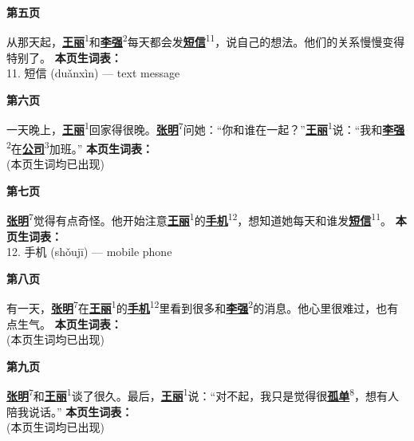 \documentclass[20pt]{extarticle}
\newcommand{\glossedword}[2]{\uline{\textbf{#1}}\textsuperscript{#2}}
\begin{document}
\begin{center}
    {\fontsize{36}{44}\selectfont \textbf{第五页}}
\end{center}
\vspace{2em}
{\fontsize{22}{30}\selectfont
\noindent
从那天起，\glossedword{王丽}{1}和\glossedword{李强}{2}每天都会发\glossedword{短信}{11}，说自己的想法。他们的关系慢慢变得特别了。
}
\vfill
{\fontsize{18}{26}\selectfont
\noindent
\textbf{本页生词表：}\\[0.5em]
11. 短信 (duǎnxìn) — text message
}
\newpage

\begin{center}
    {\fontsize{36}{44}\selectfont \textbf{第六页}}
\end{center}
\vspace{2em}
{\fontsize{22}{30}\selectfont
\noindent
一天晚上，\glossedword{王丽}{1}回家得很晚。\glossedword{张明}{7}问她：“你和谁在一起？”\glossedword{王丽}{1}说：“我和\glossedword{李强}{2}在\glossedword{公司}{3}加班。”
}
\vfill
{\fontsize{18}{26}\selectfont
\noindent
\textbf{本页生词表：}\\[0.5em]
(本页生词均已出现)
}
\newpage

\begin{center}
    {\fontsize{36}{44}\selectfont \textbf{第七页}}
\end{center}
\vspace{2em}
{\fontsize{22}{30}\selectfont
\noindent
\glossedword{张明}{7}觉得有点奇怪。他开始注意\glossedword{王丽}{1}的\glossedword{手机}{12}，想知道她每天和谁发\glossedword{短信}{11}。
}
\vfill
{\fontsize{18}{26}\selectfont
\noindent
\textbf{本页生词表：}\\[0.5em]
12. 手机 (shǒujī) — mobile phone
}
\newpage

\begin{center}
    {\fontsize{36}{44}\selectfont \textbf{第八页}}
\end{center}
\vspace{2em}
{\fontsize{22}{30}\selectfont
\noindent
有一天，\glossedword{张明}{7}在\glossedword{王丽}{1}的\glossedword{手机}{12}里看到很多和\glossedword{李强}{2}的消息。他心里很难过，也有点生气。
}
\vfill
{\fontsize{18}{26}\selectfont
\noindent
\textbf{本页生词表：}\\[0.5em]
(本页生词均已出现)
}
\newpage

\begin{center}
    {\fontsize{36}{44}\selectfont \textbf{第九页}}
\end{center}
\vspace{2em}
{\fontsize{22}{30}\selectfont
\noindent
\glossedword{张明}{7}和\glossedword{王丽}{1}谈了很久。最后，\glossedword{王丽}{1}说：“对不起，我只是觉得很\glossedword{孤单}{8}，想有人陪我说话。”
}
\vfill
{\fontsize{18}{26}\selectfont
\noindent
\textbf{本页生词表：}\\[0.5em]
(本页生词均已出现)
}
\newpage
\end{document}
